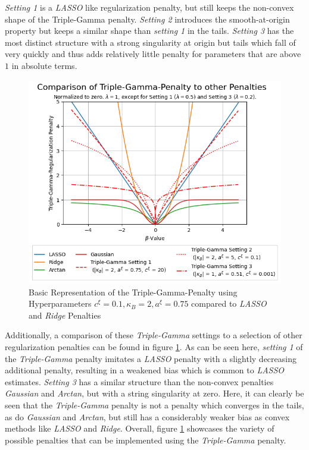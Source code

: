\documentclass[12pt,a4paper]{article}
\begin{document}
\textit{Setting 1} is a \textit{LASSO} like regularization penalty, but still keeps the non-convex shape of the Triple-Gamma penalty. \textit{Setting 2} introduces the smooth-at-origin property but keeps a similar shape than \textit{setting 1} in the tails. \textit{Setting 3} has the most distinct structure with a strong singularity at origin but tails which fall of very quickly and thus adds relatively little penalty for parameters that are above $1$ in absolute terms.\\

\begin{figure}[h!]
\centering
\includegraphics[scale=0.75]{../02_simulation/021_simulation_figures/TGPenalty_Comparison.png}
\caption{Basic Representation of the Triple-Gamma-Penalty using Hyperparameters $c^\xi = 0.1, \kappa_B = 2, a^\xi = 0.75$ compared to \textit{LASSO} and \textit{Ridge} Penalties}
\label{fig:DifferentPenalties}
\end{figure}

Additionally, a comparison of these \textit{Triple-Gamma} settings to a selection of other regularization penalties can be found in figure \ref{fig:DifferentPenalties}. As can be seen here, \textit{setting 1} of the \textit{Triple-Gamma} penalty imitates a \textit{LASSO} penalty with a slightly decreasing additional penalty, resulting in a weakened bias which is common to \textit{LASSO} estimates. \textit{Setting 3} has a similar structure than the non-convex penalties \textit{Gaussian} and \textit{Arctan}, but with a string singularity at zero. Here, it can clearly be seen that the \textit{Triple-Gamma} penalty is not a penalty which converges in the tails, as do \textit{Gaussian} and \textit{Arctan}, but still has a considerably weaker bias as convex methods like \textit{LASSO} and \textit{Ridge}. Overall, figure \ref{fig:DifferentPenalties} showcases the variety of possible penalties that can be implemented using the \textit{Triple-Gamma} penalty. 
\end{document}
